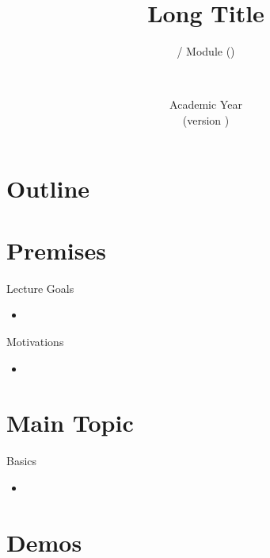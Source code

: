 \documentclass[presentation]{beamer}\mode<presentation>{\usetheme{AMSBolognaFC}}
\title[\currentLab{} -- Short Title]{
	Long Title
}
\subtitle{\courseName{} / Module \moduleN{} (\courseAcronym)}
\author[\sspeaker{\gcShort}]{\speaker{\gcFull} \\ \gcEmail}
\institute[\disiShort, \uniboShort]{\disi{} (\disiShort)\\\unibo}
\date[A.Y. \academicYear{} (v.\ \version)]{Academic Year \academicYear{}\\(version \version)}
\begin{document}

\frame{\titlepage}

\section*{Outline}
%
\frame[c]{\tableofcontents[hideallsubsections]}

\section{Premises}

\begin{frame}{Lecture Goals}
	\begin{itemize}
		\item 
	\end{itemize}
\end{frame}

\begin{frame}{Motivations}
	\begin{itemize}
		\item 
	\end{itemize}
\end{frame}

\section{Main Topic}

\begin{frame}{Basics}
	\begin{itemize}
		\item 
	\end{itemize}
\end{frame}

\section{Demos}
\end{document}
